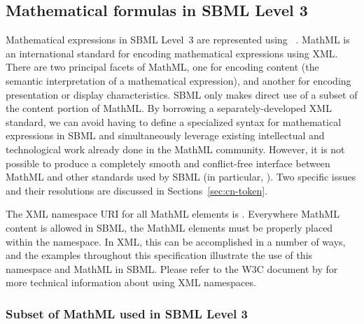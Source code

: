 \subsection{Mathematical formulas in SBML Level 3}
\label{sec:formulas}

Mathematical expressions in SBML Level~3 are represented using
\mathmltwo~\citep{w3c:2000b}.  MathML is an international standard
for encoding mathematical expressions using XML.  There are two
principal facets of MathML, one for encoding content (\ie the
semantic interpretation of a mathematical expression), and another
for encoding presentation or display characteristics.  SBML only
makes direct use of a subset of the content portion of MathML.  By
borrowing a separately-developed XML standard, we can avoid having
to define a specialized syntax for mathematical expressions in
SBML and simultaneously leverage existing intellectual and
technological work already done in the MathML community.  However,
it is not possible to produce a completely smooth and
conflict-free interface between MathML and other standards used by
SBML (in particular, \xmlschema).  Two specific issues and their
resolutions are discussed in Sections~\ref{sec:cn-token}.

The XML namespace URI for all MathML elements is
.  Everywhere MathML
content is allowed in SBML, the MathML elements must be properly
placed within the \mathmltwo namespace.  In XML, this can be
accomplished in a number of ways, and the examples throughout this
specification illustrate the use of this namespace and MathML in
SBML.  Please refer to the W3C document by \citet{bray:1999} for
more technical information about using XML namespaces.


\subsubsection{Subset of MathML used in SBML Level 3}
\label{sec:mathmlsubset}

